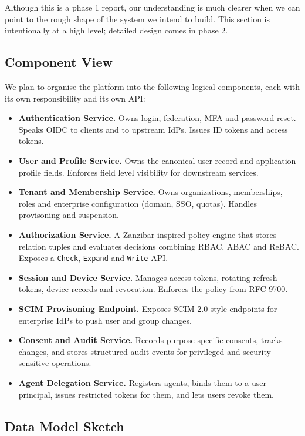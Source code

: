 \documentclass[11pt,a4paper]{article}
\begin{document}
Although this is a phase 1 report, our understanding is much clearer when we can point to the rough shape of the system we intend to build. This section is intentionally at a high level; detailed design comes in phase 2.

\subsection{Component View}

We plan to organise the platform into the following logical components, each with its own responsibility and its own API:

\begin{itemize}[leftmargin=1.5em,itemsep=2pt]
    \item \textbf{Authentication Service.} Owns login, federation, MFA and password reset. Speaks OIDC to clients and to upstream IdPs. Issues ID tokens and access tokens.
    \item \textbf{User and Profile Service.} Owns the canonical user record and application profile fields. Enforces field level visibility for downstream services.
    \item \textbf{Tenant and Membership Service.} Owns organizations, memberships, roles and enterprise configuration (domain, SSO, quotas). Handles provisoning and suspension.
    \item \textbf{Authorization Service.} A Zanzibar inspired policy engine that stores relation tuples and evaluates decisions combining RBAC, ABAC and ReBAC. Exposes a \texttt{Check}, \texttt{Expand} and \texttt{Write} API.
    \item \textbf{Session and Device Service.} Manages access tokens, rotating refresh tokens, device records and revocation. Enforces the policy from RFC 9700.
    \item \textbf{SCIM Provisoning Endpoint.} Exposes SCIM 2.0 style endpoints for enterprise IdPs to push user and group changes.
    \item \textbf{Consent and Audit Service.} Records purpose specific consents, tracks changes, and stores structured audit events for privileged and security sensitive operations.
    \item \textbf{Agent Delegation Service.} Registers agents, binds them to a user principal, issues restricted tokens for them, and lets users revoke them.
\end{itemize}

\subsection{Data Model Sketch}
\end{document}
